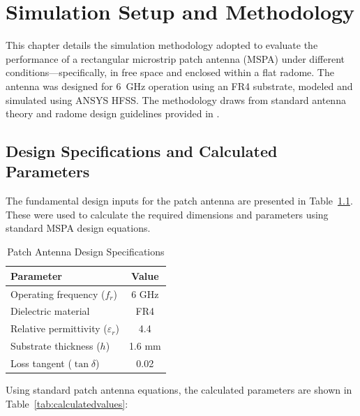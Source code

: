 \chapter{Simulation Setup and Methodology}

This chapter details the simulation methodology adopted to evaluate the performance of a rectangular microstrip patch antenna (MSPA) under different conditions—specifically, in free space and enclosed within a flat radome. The antenna was designed for 6~GHz operation using an FR4 substrate, modeled and simulated using ANSYS HFSS. The methodology draws from standard antenna theory \cite{balanis} and radome design guidelines provided in \cite{swra705}.

\section{Design Specifications and Calculated Parameters}

The fundamental design inputs for the patch antenna are presented in Table~\ref{tab:designspecs}. These were used to calculate the required dimensions and parameters using standard MSPA design equations.

\begin{table}[htbp]
\centering
\caption{Patch Antenna Design Specifications}
\begin{tabular}{lc}
\toprule
\textbf{Parameter} & \textbf{Value} \\
\midrule
Operating frequency ($f_r$) & 6 GHz \\
Dielectric material & FR4 \\
Relative permittivity ($\varepsilon_r$) & 4.4 \\
Substrate thickness ($h$) & 1.6 mm \\
Loss tangent ($\tan \delta$) & 0.02 \\
\bottomrule
\end{tabular}
\label{tab:designspecs}
\end{table}

Using standard patch antenna equations, the calculated parameters are shown in Table~\ref{tab:calculatedvalues}:

